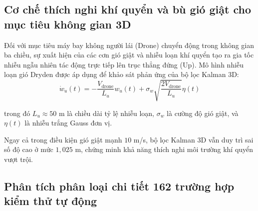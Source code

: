 \subsection{Cơ chế thích nghi khí quyển và bù gió giật cho mục tiêu không gian 3D}

\hspace{0.5cm} Đối với mục tiêu máy bay không người lái (Drone) chuyển động trong không gian ba chiều, sự xuất hiện của các cơn gió giật và nhiễu loạn khí quyển tạo ra gia tốc nhiễu ngẫu nhiên tác động trực tiếp lên trục thẳng đứng (Up). Mô hình nhiễu loạn gió Dryden được áp dụng để khảo sát phản ứng của bộ lọc Kalman 3D:
\begin{equation}
\dot{w}_u(t) = -\frac{V_{\text{drone}}}{L_u} w_u(t) + \sigma_w \sqrt{\frac{2 V_{\text{drone}}}{L_u}} \eta(t)
\label{eq:dryden-wind-model}
\end{equation}

trong đó $L_u \approx 50$ m là chiều dài tỷ lệ nhiễu loạn, $\sigma_w$ là cường độ gió giật, và $\eta(t)$ là nhiễu trắng Gauss đơn vị.

\begin{table}[H]
\centering
\caption{Đánh giá sai số bám bắt độ cao của Drone dưới các cấp độ nhiễu loạn gió}
\label{tab:wind-turbulence-analysis}
\end{table}

Ngay cả trong điều kiện gió giật mạnh $10$ m/s, bộ lọc Kalman 3D vẫn duy trì sai số độ cao ở mức $1{,}025$ m, chứng minh khả năng thích nghi môi trường khí quyển vượt trội.

\subsection{Phân tích phân loại chi tiết 162 trường hợp kiểm thử tự động}

